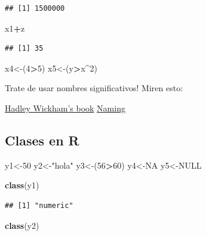 \documentclass[
]{book}
\newenvironment{Shaded}{\begin{snugshade}}{\end{snugshade}}
\newcommand{\DecValTok}[1]{\textcolor[rgb]{0.00,0.00,0.81}{#1}}
\newcommand{\KeywordTok}[1]{\textcolor[rgb]{0.13,0.29,0.53}{\textbf{#1}}}
\newcommand{\NormalTok}[1]{#1}
\newcommand{\OperatorTok}[1]{\textcolor[rgb]{0.81,0.36,0.00}{\textbf{#1}}}
\newcommand{\OtherTok}[1]{\textcolor[rgb]{0.56,0.35,0.01}{#1}}
\newcommand{\StringTok}[1]{\textcolor[rgb]{0.31,0.60,0.02}{#1}}
\begin{document}
\begin{verbatim}
## [1] 1500000
\end{verbatim}

\begin{Shaded}
\begin{Highlighting}[]
\NormalTok{x1}\OperatorTok{+}\NormalTok{z}
\end{Highlighting}
\end{Shaded}

\begin{verbatim}
## [1] 35
\end{verbatim}

\begin{Shaded}
\begin{Highlighting}[]
\NormalTok{x4<-(}\DecValTok{4}\OperatorTok{>}\DecValTok{5}\NormalTok{)}
\NormalTok{x5<-(y}\OperatorTok{>}\NormalTok{x}\OperatorTok{^}\DecValTok{2}\NormalTok{)}
\end{Highlighting}
\end{Shaded}

Trate de usar nombres significativos! Miren esto:

\href{http://adv-r.had.co.nz/}{Hadley Wickham's book}
\href{https://guiquanz.gitbooks.io/google-cc-style-guide/content/ebook/Naming.html}{Naming}

\hypertarget{clases-en-r}{%
\subsection{Clases en R}\label{clases-en-r}}

\begin{Shaded}
\begin{Highlighting}[]
\NormalTok{y1<-}\DecValTok{50}
\NormalTok{y2<-}\StringTok{"hola"}
\NormalTok{y3<-(}\DecValTok{56}\OperatorTok{>}\DecValTok{60}\NormalTok{)}
\NormalTok{y4<-}\OtherTok{NA}  
\NormalTok{y5<-}\OtherTok{NULL}

\KeywordTok{class}\NormalTok{(y1)}
\end{Highlighting}
\end{Shaded}

\begin{verbatim}
## [1] "numeric"
\end{verbatim}

\begin{Shaded}
\begin{Highlighting}[]
\KeywordTok{class}\NormalTok{(y2)}
\end{Highlighting}
\end{Shaded}
\end{document}
